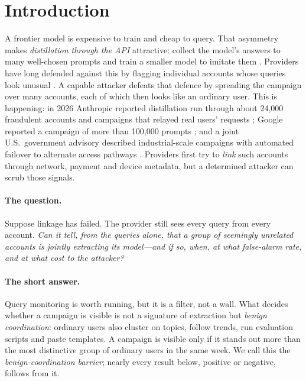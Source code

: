 \section{Introduction}
\label{sec:intro}

A frontier model is expensive to train and cheap to query. That asymmetry makes \emph{distillation through the API} attractive: collect the model's answers to many well-chosen prompts and train a smaller model to imitate them \citep{hinton2015distilling,tramer2016stealing,orekondy2019knockoff}. Providers have long defended against this by flagging individual accounts whose queries look unusual \citep{juuti2019prada,zhang2021seat,sadeghzadeh2023hoda}. A capable attacker defeats that defence by spreading the campaign over many accounts, each of which then looks like an ordinary user. This is happening: in 2026 Anthropic reported distillation run through about 24{,}000 fraudulent accounts \citep{anthropic2026distillation} and campaigns that relayed real users' requests \citep{anthropic2026threat}; Google reported a campaign of more than 100{,}000 prompts \citep{google2026gtig}; and a joint U.S.\ government advisory described industrial-scale campaigns with automated failover to alternate access pathways \citep{cisa2026aa26251a}. Providers first try to \emph{link} such accounts through network, payment and device metadata, but a determined attacker can scrub those signals.

\paragraph{The question.} Suppose linkage has failed. The provider still sees every query from every account. \emph{Can it tell, from the queries alone, that a group of seemingly unrelated accounts is jointly extracting its model---and if so, when, at what false-alarm rate, and at what cost to the attacker?}

\paragraph{The short answer.} Query monitoring is worth running, but it is a filter, not a wall. What decides whether a campaign is visible is not a signature of extraction but \emph{benign coordination}: ordinary users also cluster on topics, follow trends, run evaluation scripts and paste templates. A campaign is visible only if it stands out more than the most distinctive group of ordinary users in the same week. We call this the \emph{benign-coordination barrier}; nearly every result below, positive or negative, follows from it.

